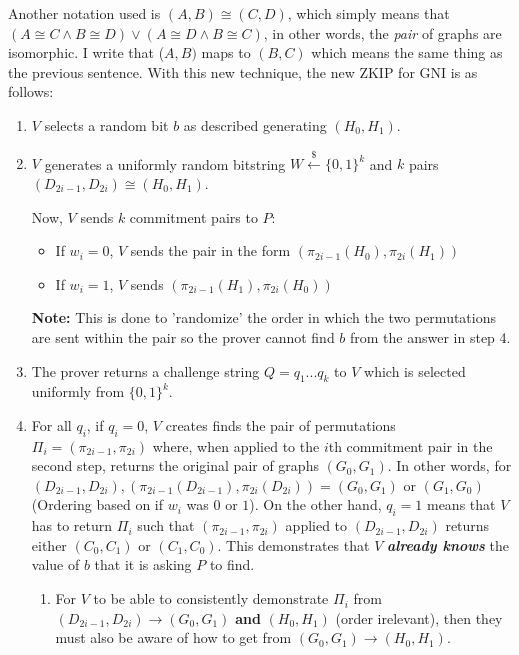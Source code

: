 \documentclass[11pt]{article}
\begin{document}
Another notation used is $(A,B) \cong (C,D)$, which simply means that $(A \cong C \land B \cong D) \lor (A \cong D \land B \cong C)$, in other words, the \textit{pair} of graphs are isomorphic. I write that ($A,B)$ maps to $(B,C)$ which means the same thing as the previous sentence. With this new technique, the new ZKIP for GNI is as follows:
\begin{enumerate}
    \item $V$ selects a random bit $b$ as described generating $(H_0, H_1)$.
    \item $V$ generates a uniformly random bitstring $W \overset{\$}{\leftarrow}\{0,1\}^k$ and $k$ pairs $(D_{2i-1},D_{2i}) \cong (H_0,H_1)$. 
    
    Now, $V$ sends $k$ commitment pairs to $P$:
    \begin{itemize}
        \item If $w_i = 0$, $V$ sends the pair in the form $(\pi_{2i-1}(H_0),\pi_{2i}(H_1))$
        \item If $w_i = 1$, $V$ sends $(\pi_{2i-1}(H_1),\pi_{2i}(H_0))$
    \end{itemize}
    
    \textbf{Note:} This is done to 'randomize' the order in which the two permutations are sent within the pair so the prover cannot find $b$ from the answer in step 4.
    \item The prover returns a challenge string $Q = q_1...q_k$ to $V$ which is selected uniformly from $\{0,1\}^k$.
    \item For all $q_i$, if $q_i = 0$, $V$ creates finds the pair of permutations $\Pi_i = (\pi_{2i-1},\pi_{2i})$ where, when applied to the $i$th commitment pair in the second step, returns the original pair of graphs $(G_0,G_1)$. In other words, for $(D_{2i-1},D_{2i}), (\pi_{2i-1}(D_{2i-1}),\pi_{2i}(D_{2i})) = (G_0,G_1)$ or $(G_1, G_0)$ (Ordering based on if $w_i$ was $0$ or $1$). On the other hand, $q_i = 1$ means that $V$ has to return $\Pi_i$ such that $(\pi_{2i-1},\pi_{2i})$ applied to $(D_{2i-1},D_{2i})$ returns either $(C_0,C_1)$ or $(C_1,C_0)$. This demonstrates that $V$ \textit{\textbf{already knows}} the value of $b$ that it is asking $P$ to find.
    \begin{enumerate}
        \item For $V$ to be able to consistently demonstrate $\Pi_i$ from \\$(D_{2i-1},D_{2i}) \rightarrow (G_0,G_1)$ \textbf{and} $(H_0,H_1)$ (order irelevant), then they must also be aware of how to get from $(G_0,G_1) \rightarrow (H_0,H_1)$. 
        

\end{enumerate}
\end{enumerate}
\end{document}
